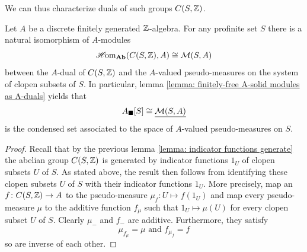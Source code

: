We can thus characterize duals of such groups ${C(S, {\mathbb{Z}})}$.
\begin{lemma}
	Let $A$ be a discrete finitely generated ${\mathbb{Z}}$-algebra. For any profinite set $S$ there is a natural isomorphism of $A$-modules
		$${\operatorname{\mathscr{H}\!om}}_{{\mathbf{Ab}}}({C(S, {\mathbb{Z}})}, A) \cong {\mathcal{M}(S, A)}$$
	between the $A$-dual of ${C(S, {\mathbb{Z}})}$ and the $A$-valued pseudo-measures on the system of clopen subsets of $S$. In particular, lemma \ref{lemma: finitely-free A-solid modules as A-duals} yields that
		$${A_\blacksquare[S]} \cong \underline{{\mathcal{M}(S, A)}}$$
	is the condensed set associated to the space of $A$-valued pseudo-measures on $S$.
\end{lemma}
\begin{proof}
	Recall that by the previous lemma \ref{lemma: indicator functions generate} the abelian group ${C(S, {\mathbb{Z}})}$ is generated by indicator functions $1_U$ of clopen subsets $U$ of $S$. As stated above, the result then follows from identifying these clopen subsets $U$ of $S$ with their indicator functions $1_U$. More precisely, map an $f\colon {C(S, {\mathbb{Z}})} \to A$ to the pseudo-measure $\mu_f\colon U\mapsto f(1_U)$ and map every pseudo-measure $\mu$ to the additive function $f_\mu$ such that $1_U\mapsto \mu(U)$ for every clopen subset $U$ of $S$. Clearly $\mu_{-}$ and $f_{-}$ are additive. Furthermore, they satisfy
		$$\mu_{f_\mu} = \mu\text{ and }f_{\mu_f}=f$$
	so are inverse of each other.
\end{proof}

